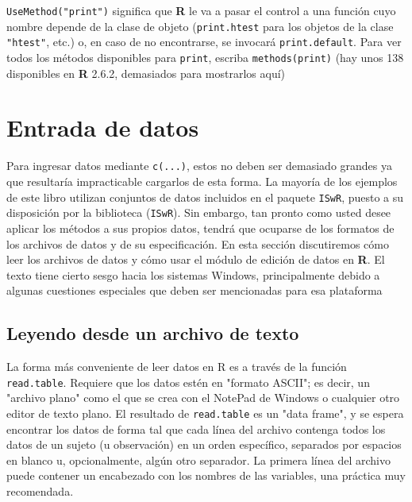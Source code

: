 \texttt{UseMethod("print")} significa que \textbf{R} le va a pasar el control a
una función cuyo nombre depende de la clase de objeto (\texttt{print.htest} para
los objetos de la clase \texttt{"htest"}, etc.) o, en caso de no encontrarse, se
invocará \texttt{print.default}. Para ver todos los métodos disponibles para
\texttt{print}, escriba \texttt{methods(print)} (hay unos 138 disponibles en
\textbf{R} 2.6.2, demasiados para mostrarlos aquí)

\section{Entrada de datos}

Para ingresar datos mediante \texttt{c(...)}, estos no deben ser demasiado
grandes ya que resultaría impracticable cargarlos de esta forma. La mayoría de
los ejemplos de este libro utilizan conjuntos de datos incluidos en el paquete
\texttt{ISwR}, puesto a su disposición por la biblioteca (\texttt{ISwR}). Sin
embargo, tan pronto como usted desee aplicar los métodos a sus propios datos,
tendrá que ocuparse de los formatos de los archivos de datos y de su
especificación. En esta sección discutiremos cómo leer los archivos de datos y
cómo usar el módulo de edición de datos en \textbf{R}. El texto tiene cierto
sesgo hacia los sistemas Windows, principalmente debido a algunas cuestiones
especiales que deben ser mencionadas para esa plataforma


\subsection{Leyendo desde un archivo de texto} \label{readtextfile}
La forma más conveniente de leer datos en R es a través de la función
\texttt{read.table}. Requiere que los datos estén en "formato ASCII"; es decir,
un "archivo plano" como el que se crea con el NotePad de Windows o cualquier
otro editor de texto plano. El resultado de \texttt{read.table} es un "data
frame", y se espera encontrar los datos de forma tal que cada línea del archivo
contenga todos los datos de un sujeto (u observación) en un orden específico,
separados por espacios en blanco u, opcionalmente, algún otro separador. La
primera línea del archivo puede contener un encabezado con los nombres de las
variables, una práctica muy recomendada.


